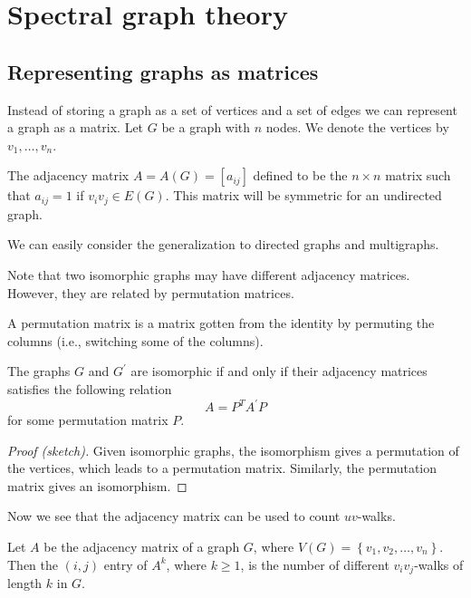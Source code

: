 \section{Spectral graph theory}
%
\subsection{Representing graphs as matrices}

Instead of storing a graph as a set of vertices and a set of edges we can represent a graph as a matrix. Let \(G\) be a graph with \(n\) nodes.
We denote the vertices by \(v_{1},\ldots,v_{n}\).

\begin{definition}
The adjacency matrix \(A=A\left(G\right) =\left[a_{ij}\right]\) defined to be the \(n\times n\) matrix such that \(a_{ij}=1\) if \(v_{i}v_{j}\in E\left(G\right)\).
This matrix will be symmetric for an undirected graph.
\end{definition}

We can easily consider the generalization to directed graphs and multigraphs.

Note that two isomorphic graphs may have different adjacency matrices.
However, they are related by permutation matrices.

\begin{definition}
A permutation matrix is a matrix gotten from the identity by permuting the columns (i.e., switching some of the columns).
\end{definition}

\begin{lemma}
The graphs \(G\) and \(G^{\prime}\) are isomorphic if and only if their adjacency matrices satisfies the following relation
\[
A=P^{T}A^{\prime}P
\]
for some permutation matrix \(P\).
\end{lemma}

\begin{proof}[Proof (sketch)]
Given isomorphic graphs, the isomorphism gives a permutation of the vertices, which leads to a permutation matrix.
Similarly, the permutation matrix gives an isomorphism.
\end{proof}

Now we see that the adjacency matrix can be used to count \(uv\)-walks.

\begin{theorem}
Let \(A\) be the adjacency matrix of a graph \(G\), where \(V\left(  G\right)=\left\{v_{1},v_{2},\ldots,v_{n}\right\}\).
Then the \(\left(i,j\right)\) entry of \(A^{k}\), where \(k\geq1\), is the number of different \(v_{i}v_{j}\)-walks of length \(k\) in \(G\).
\end{theorem}

